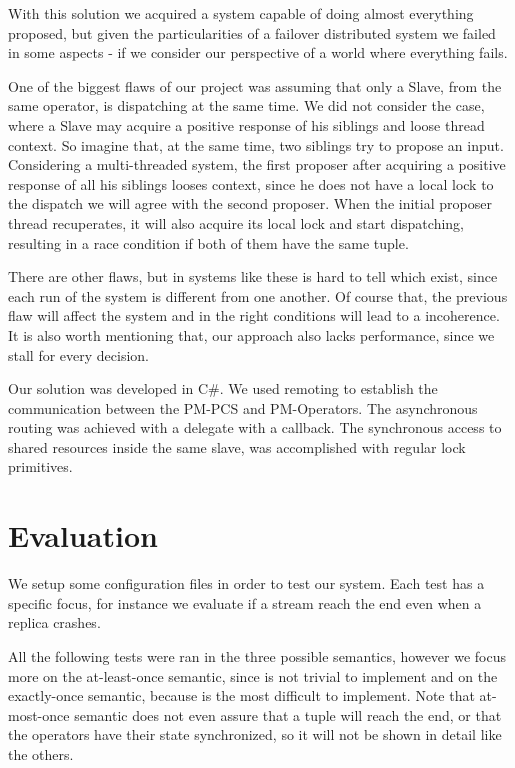 \documentclass[times, 10pt,twocolumn]{article}
\begin{document}
With this solution we acquired a system capable of doing almost everything proposed, but given the particularities of a failover distributed system we failed in some aspects - if we consider our perspective of a world where everything fails. 

One of the biggest flaws of our project was assuming that only a Slave, from the same operator, is dispatching at the same time. We did not consider the case, where a Slave may acquire a positive response of his siblings and loose thread context. So imagine that, at the same time, two siblings try to propose an input. Considering a multi-threaded system, the first proposer after acquiring a positive response of all his siblings looses context, since he does not have a local lock to the dispatch we will agree with the second proposer. When the initial proposer thread recuperates, it will also acquire its local lock and start dispatching, resulting in a race condition if both of them have the same tuple.

There are other flaws, but in systems like these is hard to tell which exist, since each run of the system is different from one another. Of course that, the previous flaw will affect the system and in the right conditions will lead to a incoherence. It is also worth mentioning that, our approach also lacks performance, since we stall for every decision.


Our solution was developed in C\#. We used remoting to establish the communication between the PM-PCS and PM-Operators. The asynchronous routing was achieved with a delegate with a callback. The synchronous access to shared resources inside the same slave, was accomplished with regular lock primitives.

\section{Evaluation}

We setup some configuration files in order to test our system. Each test 
has a specific focus, for instance we evaluate if a stream reach the end even when 
a replica crashes.

All the following tests were ran in the three possible semantics, however we focus more on the at-least-once semantic, since is not trivial to implement and on the exactly-once semantic, because is the most difficult to implement. Note that at-most-once semantic does not even assure that a tuple will reach the end, or that the operators have their state synchronized, so it will not be shown in detail like the others. 
\end{document}
